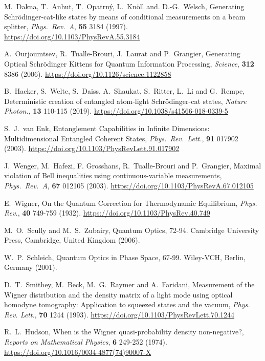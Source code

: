 \begin{thebibliography}{}
    M.\ Dakna, T.\ Anhut, T.\ Opatrn\'y, L.\ Knöll and. D.-G.\ Welsch, Generating Schrödinger-cat-like states by means of conditional measurements on a beam splitter, \emph{Phys.\ Rev.\ A}, \textbf{55} 3184 (1997). \url{https://doi.org/10.1103/PhysRevA.55.3184}
    
    A.\ Ourjoumtsev, R.\ Tualle-Brouri, J.\ Laurat and P.\ Grangier, Generating Optical Schrödinger Kittens for Quantum Information Processing, \emph{Science}, \textbf{312} 8386 (2006). \url{https://doi.org/10.1126/science.1122858}

    B.\ Hacker, S.\ Welte, S.\ Daiss, A.\ Shaukat, S.\ Ritter, L.\ Li and G.\ Rempe, Deterministic creation of entangled atom-light Schrödinger-cat states, \emph{Nature Photon.}, \textbf{13} 110-115 (2019). \url{https://doi.org/10.1038/s41566-018-0339-5}

    S.\ J.\ van Enk, Entanglement Capabilities in Infinite Dimensions: Multidimensional Entangled Coherent States, \emph{Phys.\ Rev.\ Lett.}, \textbf{91} 017902 (2003). \url{https://doi.org/10.1103/PhysRevLett.91.017902}
    
    J.\ Wenger, M.\ Hafezi, F. Grosshans, R.\ Tualle-Brouri and P.\ Grangier, Maximal violation of Bell inequalities using continuous-variable measurements, \emph{Phys.\ Rev.\ A}, \textbf{67} 012105 (2003). \url{https://doi.org/10.1103/PhysRevA.67.012105}
    
E.\ Wigner, On the Quantum Correction for Thermodynamic Equilibrium, \emph{Phys. Rev.}, \textbf{40} 749-759 (1932). \url{https://doi.org/10.1103/PhysRev.40.749}

    M.\ O.\ Scully and M.\ S.\ Zubairy, Quantum Optics, 72-94. Cambridge University Press, Cambridge, United Kingdom (2006).

W.\ P.\ Schleich, Quantum Optics in Phase Space, 67-99. Wiley-VCH, Berlin, Germany (2001).
    
D.\ T.\ Smithey, M.\ Beck, M.\ G.\ Raymer and A.\ Faridani, Measurement of the Wigner distribution and the density matrix of a light mode using optical homodyne tomography: Application to squeezed states and the vacuum, \emph{Phys. Rev. Lett.}, \textbf{70} 1244 (1993). \url{https://doi.org/10.1103/PhysRevLett.70.1244}

    R.\ L.\ Hudson, When is the Wigner quasi-probability density non-negative?, \emph{Reports on Mathematical Physics}, \textbf{6} 249-252 (1974). \url{https://doi.org/10.1016/0034-4877(74)90007-X}
    

\end{thebibliography}
